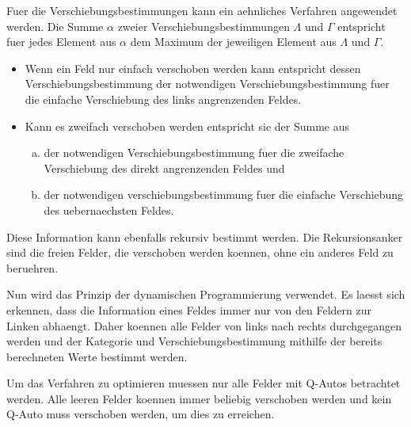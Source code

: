 \documentclass[a4paper,10pt,ngerman]{scrartcl}
\begin{document}
Fuer die Verschiebungsbestimmungen kann ein aehnliches Verfahren angewendet werden.
Die Summe $\alpha$ zweier Verschiebungsbestimmungen $\Lambda$ und $\Gamma$ entspricht fuer jedes Element aus $\alpha$ dem Maximum der jeweiligen Element aus $\Lambda$ und $\Gamma$.
\begin{itemize}
    \item Wenn ein Feld nur einfach verschoben werden kann entspricht dessen Verschiebungsbestimmung der notwendigen Verschiebungsbestimmung fuer die einfache Verschiebung des links angrenzenden Feldes.
    \item Kann es zweifach verschoben werden entspricht sie der Summe aus
          \begin{enumerate}[a)]
              \item der notwendigen Verschiebungsbestimmung fuer die zweifache Verschiebung des direkt angrenzenden Feldes und
              \item der notwendigen verschiebungsbestimmung fuer die einfache Verschiebung des uebernaechsten Feldes.
          \end{enumerate}
\end{itemize}
Diese Information kann ebenfalls rekursiv bestimmt werden.
Die Rekursionsanker sind die freien Felder, die verschoben werden koennen, ohne ein anderes Feld zu beruehren.

Nun wird das Prinzip der dynamischen Programmierung verwendet.
Es laesst sich erkennen, dass die Information eines Feldes immer nur von den Feldern zur Linken abhaengt.
Daher koennen alle Felder von links nach rechts durchgegangen werden und der Kategorie und Verschiebungsbestimmung mithilfe der bereits berechneten Werte bestimmt werden.

Um das Verfahren zu optimieren muessen nur alle Felder mit Q-Autos betrachtet werden.
Alle leeren Felder koennen immer beliebig verschoben werden und kein Q-Auto muss verschoben werden, um dies zu erreichen.
\end{document}
